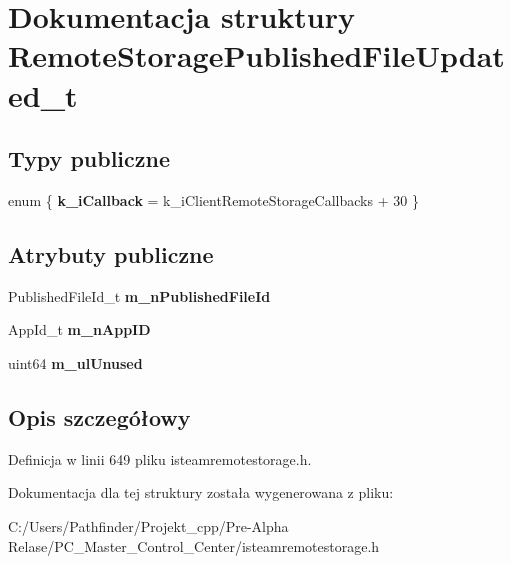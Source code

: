 \hypertarget{struct_remote_storage_published_file_updated__t}{}\section{Dokumentacja struktury Remote\+Storage\+Published\+File\+Updated\+\_\+t}
\label{struct_remote_storage_published_file_updated__t}
\subsection*{Typy publiczne}
\begin{DoxyCompactItemize}
\item 
\mbox{\label{struct_remote_storage_published_file_updated__t_a985bfe1ca36a7ff1bb7a0041313b05d2}} 
enum \{ {\bfseries k\+\_\+i\+Callback} = k\+\_\+i\+Client\+Remote\+Storage\+Callbacks + 30
 \}
\end{DoxyCompactItemize}
\subsection*{Atrybuty publiczne}
\begin{DoxyCompactItemize}
\item 
\mbox{\label{struct_remote_storage_published_file_updated__t_acd376f5fa18f81c1a2719129d64f27b8}} 
Published\+File\+Id\+\_\+t {\bfseries m\+\_\+n\+Published\+File\+Id}
\item 
\mbox{\label{struct_remote_storage_published_file_updated__t_a212aae00a00b66cb761fbc3add74f133}} 
App\+Id\+\_\+t {\bfseries m\+\_\+n\+App\+ID}
\item 
\mbox{\label{struct_remote_storage_published_file_updated__t_a7170df73ebb408f46b72d1a80b3d9ae1}} 
uint64 {\bfseries m\+\_\+ul\+Unused}
\end{DoxyCompactItemize}


\subsection{Opis szczegółowy}


Definicja w linii 649 pliku isteamremotestorage.\+h.



Dokumentacja dla tej struktury została wygenerowana z pliku\+:\begin{DoxyCompactItemize}
\item 
C\+:/\+Users/\+Pathfinder/\+Projekt\+\_\+cpp/\+Pre-\/\+Alpha Relase/\+P\+C\+\_\+\+Master\+\_\+\+Control\+\_\+\+Center/isteamremotestorage.\+h\end{DoxyCompactItemize}
